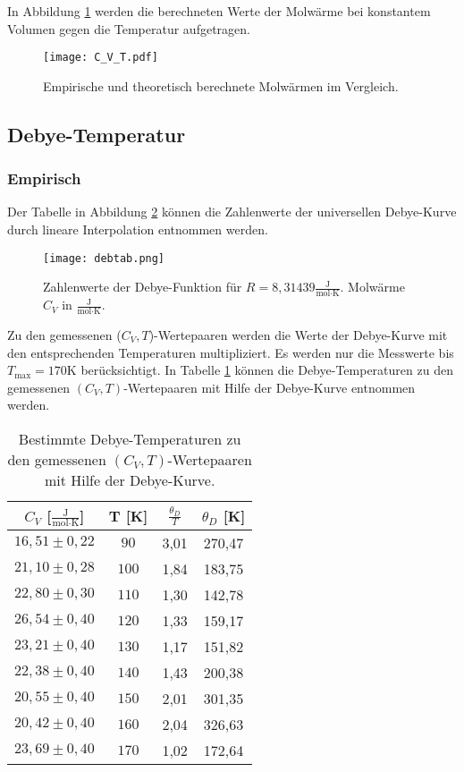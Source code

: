In Abbildung \ref{C_V} werden die berechneten Werte der Molwärme bei konstantem Volumen gegen die Temperatur aufgetragen.

\begin{figure}[H]
  \centering
  \texttt{[image: C\_V\_T.pdf]}
  \caption{Empirische und theoretisch berechnete Molwärmen im Vergleich.}
  \label{C_V}
\end{figure}

\subsection{Debye-Temperatur}
\subsubsection{Empirisch}

Der Tabelle in Abbildung \ref{debfkt} können die Zahlenwerte der universellen Debye-Kurve durch lineare Interpolation entnommen werden.

\begin{figure}[H]
  \centering
  \texttt{[image: debtab.png]}
  \caption{Zahlenwerte der Debye-Funktion für $R = 8,31439\frac{\text{J}}{\text{mol}\cdot\text{K}}$. Molwärme $C_V$ in $\frac{\text{J}}{\text{mol}\cdot\text{K}}$. \cite{skript}}
  \label{debfkt}
\end{figure}

Zu den gemessenen ($C_V,T$)-Wertepaaren werden die Werte der Debye-Kurve mit den entsprechenden Temperaturen multipliziert.
Es werden nur die Messwerte bis $T_{\text{max}} = 170$K berücksichtigt.
In Tabelle \ref{tab:3} können die Debye-Temperaturen zu den gemessenen $(C_V,T)$-Wertepaaren mit Hilfe der Debye-Kurve entnommen werden.

\begin{table}[H]
  \centering
  \begin{tabular}{cccc}
    \toprule
    $C_V$ [$\frac{\text{J}}{\text{mol}\cdot\text{K}}$] & T [K] & $\frac{\theta_D}{T}$ & $\theta_D$ [K] \\
    \midrule
    $16,51 \pm 0,22$ & $ 90$ & 3,01 & 270,47 \\
    $21,10 \pm 0,28$ & $100$ & 1,84 & 183,75 \\
    $22,80 \pm 0,30$ & $110$ & 1,30 & 142,78 \\
    $26,54 \pm 0,40$ & $120$ & 1,33 & 159,17 \\
    $23,21 \pm 0,40$ & $130$ & 1,17 & 151,82 \\
    $22,38 \pm 0,40$ & $140$ & 1,43 & 200,38 \\
    $20,55 \pm 0,40$ & $150$ & 2,01 & 301,35 \\
    $20,42 \pm 0,40$ & $160$ & 2,04 & 326,63 \\
    $23,69 \pm 0,40$ & $170$ & 1,02 & 172,64 \\
    \bottomrule
  \end{tabular}
  \caption{Bestimmte Debye-Temperaturen zu den gemessenen $(C_V,T)$-Wertepaaren mit Hilfe der Debye-Kurve.}
  \label{tab:3}
\end{table}

